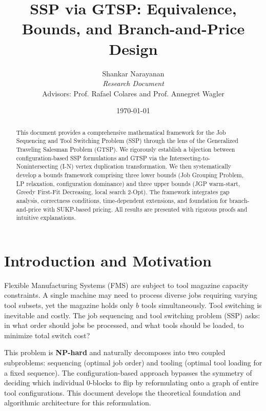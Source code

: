 \documentclass[12pt]{article}
\begin{document}
	
	\title{SSP via GTSP: Equivalence, Bounds, and Branch-and-Price Design}
	\author{Shankar Narayanan \\
		\textit{Research Document} \\
		Advisors: Prof. Rafael Colares and Prof. Annegret Wagler}
	\date{\today}
	\maketitle
	
	\begin{abstract}
		This document provides a comprehensive mathematical framework for the Job Sequencing and Tool Switching Problem (SSP) through the lens of the Generalized Traveling Salesman Problem (GTSP). We rigorously establish a bijection between configuration-based SSP formulations and GTSP via the Intersecting-to-Nonintersecting (I-N) vertex duplication transformation. We then systematically develop a bounds framework comprising three lower bounds (Job Grouping Problem, LP relaxation, configuration dominance) and three upper bounds (JGP warm-start, Greedy First-Fit Decreasing, local search 2-Opt). The framework integrates gap analysis, correctness conditions, time-dependent extensions, and foundation for branch-and-price with SUKP-based pricing. All results are presented with rigorous proofs and intuitive explanations.
	\end{abstract}

	\tableofcontents
	
	\newpage
	
	\section{Introduction and Motivation}
	
	Flexible Manufacturing Systems (FMS) are subject to tool magazine capacity constraints. A single machine may need to process diverse jobs requiring varying tool subsets, yet the magazine holds only $b$ tools simultaneously. Tool switching is inevitable and costly. The job sequencing and tool switching problem (SSP) asks: in what order should jobs be processed, and what tools should be loaded, to minimize total switch cost?
	
	This problem is \textbf{NP-hard} and naturally decomposes into two coupled subproblems: sequencing (optimal job order) and tooling (optimal tool loading for a fixed sequence). The configuration-based approach bypasses the symmetry of deciding which individual 0-blocks to flip by reformulating onto a graph of entire tool configurations. This document develops the theoretical foundation and algorithmic architecture for this reformulation.
	
\end{document}
